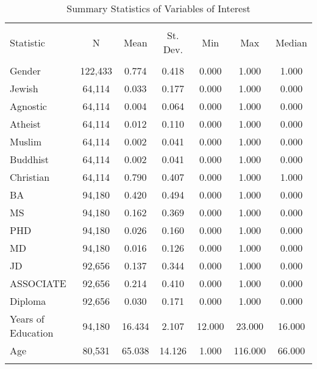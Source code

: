 \documentclass[12pt,english]{article}
\begin{document}
\begin{table}[ht]
\caption{Summary Statistics of Variables of Interest}
\label{tab:descriptives} 
\centering
\begin{threeparttable}
\begin{tabular}{@{\extracolsep{5pt}}lcccccc} 
\\[-1.8ex]\hline 
\hline \\[-1.8ex] 
Statistic & \multicolumn{1}{c}{N} & \multicolumn{1}{c}{Mean} & \multicolumn{1}{c}{St. Dev.} & \multicolumn{1}{c}{Min} & \multicolumn{1}{c}{Max} & \multicolumn{1}{c}{Median} \\ 
\hline \\[-1.8ex] 

Gender & 122,433 & 0.774 & 0.418 & 0.000 & 1.000 & 1.000 \\ 
Jewish & 64,114 & 0.033 & 0.177 & 0.000 & 1.000 & 0.000 \\ 
Agnostic & 64,114 & 0.004 & 0.064 & 0.000 & 1.000 & 0.000 \\ 
Atheist & 64,114 & 0.012 & 0.110 & 0.000 & 1.000 & 0.000 \\ 
Muslim & 64,114 & 0.002 & 0.041 & 0.000 & 1.000 & 0.000 \\ 
Buddhist & 64,114 & 0.002 & 0.041 & 0.000 & 1.000 & 0.000 \\ 
Christian & 64,114 & 0.790 & 0.407 & 0.000 & 1.000 & 1.000 \\ 
BA & 94,180 & 0.420 & 0.494 & 0.000 & 1.000 & 0.000 \\ 
MS & 94,180 & 0.162 & 0.369 & 0.000 & 1.000 & 0.000 \\ 
PHD & 94,180 & 0.026 & 0.160 & 0.000 & 1.000 & 0.000 \\ 
MD & 94,180 & 0.016 & 0.126 & 0.000 & 1.000 & 0.000 \\ 
JD & 92,656 & 0.137 & 0.344 & 0.000 & 1.000 & 0.000 \\ 
ASSOCIATE & 92,656 & 0.214 & 0.410 & 0.000 & 1.000 & 0.000 \\ 
Diploma & 92,656 & 0.030 & 0.171 & 0.000 & 1.000 & 0.000 \\ 
Years of Education & 94,180 & 16.434 & 2.107 & 12.000 & 23.000 & 16.000 \\ 
Age & 80,531 & 65.038 & 14.126 & 1.000 & 116.000 & 66.000 \\ 
\hline \\[-1.8ex] 
\end{tabular} 
\end{threeparttable}
\end{table}
\end{document}
